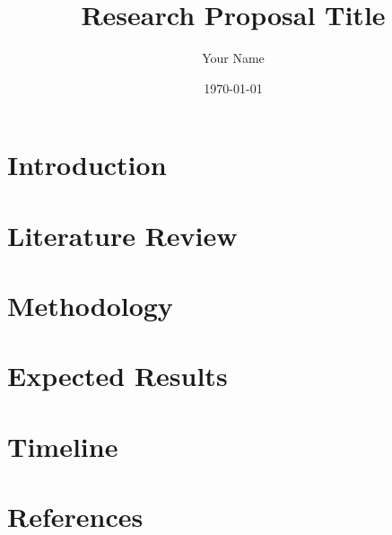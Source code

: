 \documentclass[12pt]{article}
\begin{document}
\title{Research Proposal Title}
\author{Your Name}
\date{\today}
\maketitle

\begin{abstract}
\end{abstract}

\section{Introduction}

\section{Literature Review}

\section{Methodology}

\section{Expected Results}

\section{Timeline}

\section{References}
\end{document}
